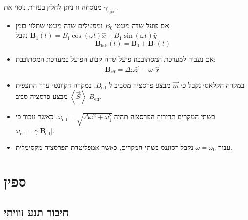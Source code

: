 \documentclass{tstextbook}
\begin{document}
\begin{remark}
מנוסחה זו ניתן לחלץ בעזרת ניסוי את \(\gamma_{\text{spin}}\).

\end{remark}
\begin{summary}
  \begin{itemize}
    \item אם פועל שדה מגנטי \(B_{0}\) ומפעילים שדה מגנטי שתלוי בזמן \(\mathbf{B}_{1}(t)=B_{1}\cos(\omega t){\hat{x}}+B_{1}\sin(\omega t){\hat{y}}\) נקבל
$$\mathbf{B}_{\mathrm{lab}}(t)=\mathbf{B}_{0}+\mathbf{B}_{1}(t)$$
    \item אם נעבור למערכת המסתובבת פועל שדה קבוע הפועל במערכת המסתובבת:
$$\mathbf{B}_{\mathrm{eff}}=\Delta\omega\hat{z}^{\prime}-\omega_{1}\hat{x}^{\prime}$$
    \item במקרה הקלאסי נקבל כי \(\vec{m}\) מבצע פרסציה מסביב ל-\(B_{\text{eff}}\). במקרה הקוונטי ערך התצפית \(\left\langle  \vec{S}  \right\rangle\) מבצע פרסציה סביב \(B_{\mathrm{eff}}\).
    \item בשתי המקרים תדירות הפרסציה תהיה \(\omega_{\mathrm{eff}}=\sqrt{ \Delta \omega^{2}+\omega_{1}^{2} }\). כאשר נזכור כי \(\omega_{\mathrm{eff}}=\gamma|\mathbf{B}_{\mathrm{eff}}|\).
    \item עבור \(\omega=\omega_{0}\) נקבל רסוננס בשתי המקרים, כאשר אמפליטדת הפרסציה מקסימלית.
  \end{itemize}
\end{summary}
\section{ספין}

\subsection{חיבור תנע זוויתי}
\end{document}
